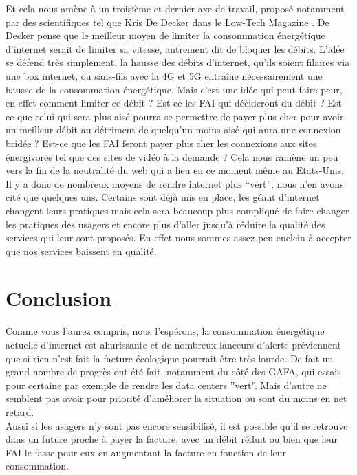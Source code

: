 \documentclass[a4paper,twocolumn,12pt]{article}
\begin{document}
	Et cela nous amène à un troisième et dernier axe de travail, proposé notamment par des scientifiques tel que Kris De Decker dans le Low-Tech Magazine \cite{4}. De Decker pense que le meilleur moyen de limiter la consommation énergétique d’internet serait de limiter sa vitesse, autrement dit de bloquer les débits. L’idée se défend très simplement, la hausse des débits d’internet, qu’ils soient filaires via une box internet, ou sans-fils avec la 4G et 5G entraîne nécessairement une hausse de la consommation énergétique. Mais c’est une idée qui peut faire peur, en effet comment limiter ce débit ? Est-ce les FAI qui décideront du débit ? Est-ce que celui qui sera plus aisé pourra se permettre de payer plus cher pour avoir un meilleur débit au détriment de quelqu'un moins aisé qui aura une connexion bridée ? Est-ce que les FAI feront payer plus cher les connexions aux sites énergivores tel que des sites de vidéo à la demande ? Cela nous ramène un peu vers la fin de la neutralité du web qui a lieu en ce moment même au Etats-Unis. \\

	Il y a donc de nombreux moyens de rendre internet plus “vert”, nous n’en avons cité que quelques uns. Certains sont déjà mis en place, les géant d'internet changent leurs pratiques mais cela sera beaucoup plus compliqué de faire changer les pratiques des usagers et encore plus d’aller jusqu’à réduire la qualité des services qui leur sont proposés. En effet nous sommes assez peu enclein à accepter que nos services baissent en qualité.

\section{Conclusion} 

	Comme vous l’aurez compris, nous l’espérons, la consommation énergétique actuelle d’internet est ahurissante et de nombreux lanceurs d’alerte préviennent que si rien n’est fait la facture écologique pourrait être très lourde. De fait un grand nombre de progrès ont été fait, notamment du côté des GAFA, qui essais pour certaine par exemple de rendre les data centers ''vert''. Mais d’autre ne semblent pas avoir pour priorité d’améliorer la situation ou sont du moins en net retard. \\

	Aussi si les usagers n’y sont pas encore sensibilisé, il est possible qu’il se retrouve dans un future proche à payer la facture, avec un débit réduit ou bien que leur FAI le fasse pour eux en augmentant la facture en fonction de leur consommation. \\
\end{document}
